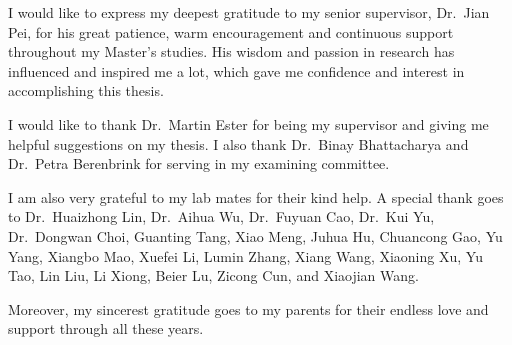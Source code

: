
%
%

I would like to express my deepest gratitude to my senior supervisor, Dr.~Jian Pei, for his great patience, warm encouragement and continuous support throughout my Master's studies. His wisdom and passion in research has influenced and inspired me a lot, which gave me confidence and interest in accomplishing this thesis. 

I would like to thank Dr.~Martin Ester for being my supervisor and giving me helpful suggestions on my thesis. I also thank Dr.~Binay Bhattacharya and Dr.~Petra Berenbrink for serving in my examining committee.  

I am also very grateful to my lab mates for their kind help. A special thank goes to Dr.~Huaizhong Lin, Dr.~Aihua Wu, Dr.~Fuyuan Cao, Dr.~Kui Yu,  Dr.~Dongwan Choi, Guanting Tang, Xiao Meng, Juhua Hu, Chuancong Gao, Yu Yang, Xiangbo Mao, Xuefei Li, Lumin Zhang, Xiang Wang, Xiaoning Xu, Yu Tao, Lin Liu, Li Xiong, Beier Lu, Zicong Cun, and Xiaojian Wang.

Moreover, my sincerest gratitude goes to my parents for their endless love and support through all these years.
